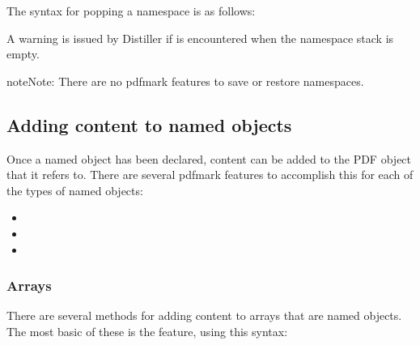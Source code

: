 \documentclass[letterpaper,12pt,english,openany,oneside]{sphinxmanual}
\begin{document}
The syntax for popping a namespace is as follows:

\begin{sphinxVerbatim}[commandchars=\\\{\}]
\PYG{p}{[}  
\end{sphinxVerbatim}

A warning is issued by Distiller if  is encountered when the namespace stack is empty.

\begin{sphinxVerbatim}[commandchars=\\\{\}]
\PYG{p}{[}        \PYG{p}{]}
\end{sphinxVerbatim}

\begin{sphinxadmonition}{note}{Note:}
There are no pdfmark features to save or restore namespaces.
\end{sphinxadmonition}


\subsection{Adding content to named objects}
\label{\detokenize{pdfmark_Syntax:adding-content-to-named-objects}}
Once a named object has been declared, content can be added to the PDF object that it refers to. There are several pdfmark features to accomplish this for each of the types of named objects:
\begin{itemize}
\item {} 

\item {} 

\item {} 

\end{itemize}


\subsubsection{Arrays}
\label{\detokenize{pdfmark_Syntax:arrays}}
There are several methods for adding content to arrays that are named objects. The most basic of these is the  feature, using this syntax:
\end{document}
